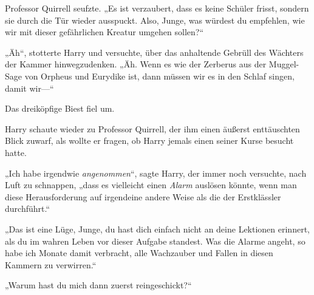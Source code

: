 Professor Quirrell seufzte.
„Es ist verzaubert, dass es keine Schüler frisst, sondern sie durch die Tür wieder ausspuckt. Also, Junge, was würdest du empfehlen, wie wir mit dieser gefährlichen Kreatur umgehen sollen?“

„Äh“, stotterte Harry und versuchte, über das anhaltende Gebrüll des Wächters der Kammer hinwegzudenken. „Äh. Wenn es wie der Zerberus aus der Muggel-Sage von Orpheus und Eurydike ist, dann müssen wir es in den Schlaf singen, damit wir—“


Das dreiköpfige Biest fiel um.

Harry schaute wieder zu Professor Quirrell, der ihm einen äußerst enttäuschten Blick zuwarf, als wollte er fragen, ob Harry jemals einen seiner Kurse besucht hatte.

„Ich habe irgendwie \emph{angenommen}“, sagte Harry, der immer noch versuchte, nach Luft zu schnappen, „dass es vielleicht einen \emph{Alarm} auslösen könnte, wenn man diese Herausforderung auf irgendeine andere Weise als die der Erstklässler durchführt.“

„Das ist eine Lüge, Junge, du hast dich einfach nicht an deine Lektionen erinnert, als du im wahren Leben vor dieser Aufgabe standest. Was die Alarme angeht, so habe ich Monate damit verbracht, alle Wachzauber und Fallen in diesen Kammern zu verwirren.“

„Warum hast du mich dann zuerst reingeschickt?“

